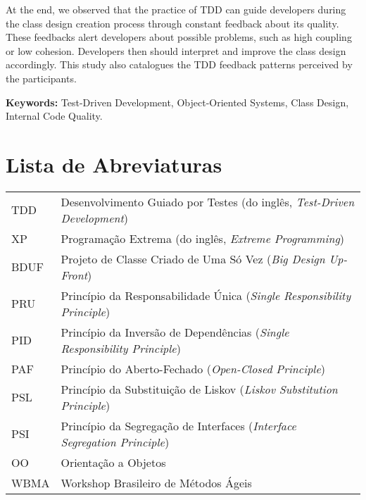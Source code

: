 \documentclass[11pt,openany,twoside,a4paper]{book}
\begin{document}
At the end, we observed that the practice of TDD can guide developers during the 
class design creation process through constant feedback about its quality.
These feedbacks alert developers about possible problems, such as high coupling or
low cohesion. Developers then should interpret and improve the class design accordingly.
This study also catalogues the TDD feedback patterns perceived by the participants.

\noindent \textbf{Keywords:} Test-Driven Development, Object-Oriented
Systems, Class Design, Internal Code Quality.

\tableofcontents    %

\chapter{Lista de Abreviaturas}
\begin{tabular}{ll}
         TDD         & Desenvolvimento Guiado por Testes (do inglês, \emph{Test-Driven Development})\\ 
         
         XP          & Programação Extrema (do inglês, \emph{Extreme Programming})\\
		 
		 BDUF		 & Projeto de Classe Criado de Uma Só Vez (\textit{Big Design Up-Front})\\
		 
		 PRU		 & Princípio da Responsabilidade Única (\emph{Single Responsibility
		 Principle})\\
		 
		 PID		 & Princípio da Inversão de Dependências (\emph{Single Responsibility
		 Principle})\\ 
		 
		 PAF		 & Princípio do Aberto-Fechado (\emph{Open-Closed Principle})\\
		 
		 PSL	 	 & Princípio da Substituição de Liskov (\emph{Liskov Substitution
		 Principle})\\
		 
		 PSI		 & Princípio da Segregação de Interfaces (\emph{Interface Segregation
		 Principle})\\
		 
		 OO		 	 & Orientação a Objetos\\
		
		 WBMA		 & Workshop Brasileiro de Métodos Ágeis
		 
\end{tabular}
\end{document}

